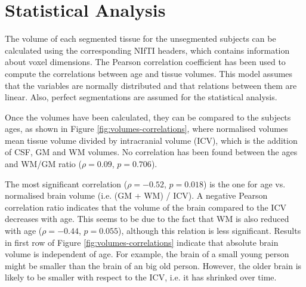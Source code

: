 \section{Statistical Analysis}



The volume of each segmented tissue for the unsegmented subjects can be calculated using the corresponding NIfTI headers, which contains information about voxel dimensions. The Pearson correlation coefficient has been used to compute the correlations between age and tissue volumes. This model assumes that the variables are normally distributed and that relations between them are linear. Also, perfect segmentations are assumed for the statistical analysis.

Once the volumes have been calculated, they can be compared to the subjects ages, as shown in Figure \ref{fig:volumes-correlations}, where normalised volumes mean tissue volume divided by intracranial volume (ICV), which is the addition of CSF, GM and WM volumes. No correlation has been found between the ages and WM/GM ratio ($\rho = 0.09$, $p = 0.706$).

The most significant correlation ($\rho = -0.52$, $p = 0.018$) is the one for age vs. normalised brain volume (i.e. (GM + WM) / ICV). A negative Pearson correlation ratio indicates that the volume of the brain compared to the ICV decreases with age. This seems to be due to the fact that WM is also reduced with age ($\rho = -0.44$, $p = 0.055$), although this relation is less significant. Results in first row of Figure \ref{fig:volumes-correlations} indicate that absolute brain volume is independent of age. For example, the brain of a small young person might be smaller than the brain of an big old person. However, the older brain is likely to be smaller with respect to the ICV, i.e. it has shrinked over time.


